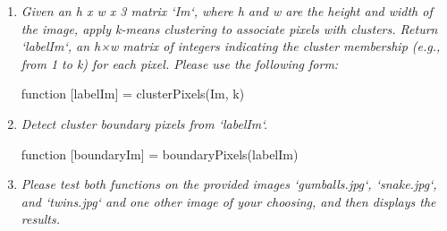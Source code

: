 \documentclass[11pt]{article}
\begin{document}
    \begin{enumerate}
        \item \textit{Given an h x w x 3 matrix ‘Im‘, where h and w are the height and width of the image, apply k-means clustering to
        associate pixels with clusters. Return ‘labelIm‘, an h×w matrix of integers indicating the cluster membership (e.g., from 1 to k) for each pixel.
        Please use the following form:}\newline
        \begin{center}
            function [labelIm] = clusterPixels(Im, k)
        \end{center}

        \item \textit{Detect cluster boundary pixels from ‘labelIm‘.}\newline
        \begin{center}
            function [boundaryIm] = boundaryPixels(labelIm)
        \end{center}

        \item \textit{Please test both functions on the provided images ‘gumballs.jpg‘, ‘snake.jpg‘, and ‘twins.jpg‘ and one other image of your
        choosing, and then displays the results.}\newline

    \end{enumerate}
\end{document}
